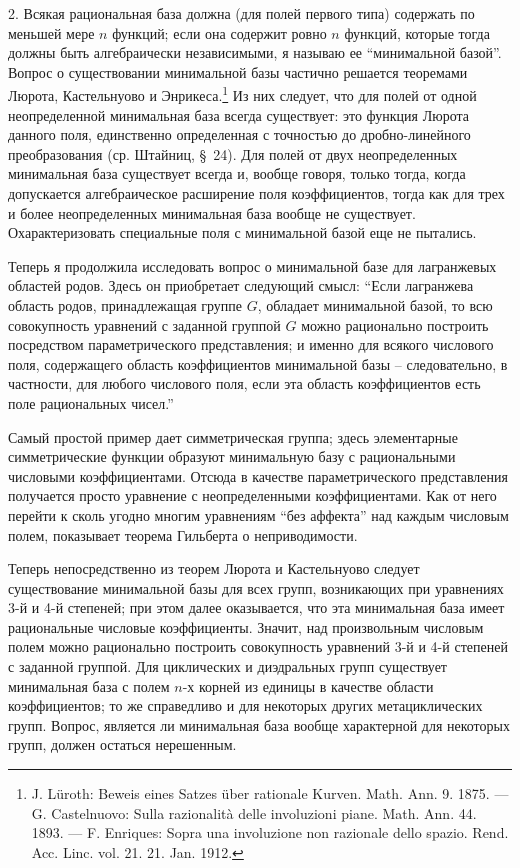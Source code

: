 \documentclass[11pt]{article}
\begin{document}
2. Всякая рациональная база должна (для полей первого типа) содержать по меньшей мере $n$ функций; если она содержит ровно $n$ функций, которые тогда должны быть алгебраически независимыми, я называю ее ``минимальной базой''. Вопрос о существовании минимальной базы частично решается теоремами Люрота, Кастельнуово и Энрикеса.\footnote{J. Lüroth: Beweis eines Satzes über rationale Kurven. Math. Ann. 9. 1875. --- G. Castelnuovo: Sulla razionalità delle involuzioni piane. Math. Ann. 44. 1893. --- F. Enriques: Sopra una involuzione non razionale dello spazio. Rend. Acc. Linc. vol. 21. 21. Jan. 1912.} Из них следует, что для полей от одной неопределенной минимальная база всегда существует: это функция Люрота данного поля, единственно определенная с точностью до дробно-линейного преобразования (ср. Штайниц, \S\ 24). Для полей от двух неопределенных минимальная база существует всегда и, вообще говоря, только тогда, когда допускается алгебраическое расширение поля коэффициентов, тогда как для трех и более неопределенных минимальная база вообще не существует. Охарактеризовать специальные поля с минимальной базой еще не пытались.

Теперь я продолжила исследовать вопрос о минимальной базе для лагранжевых областей родов. Здесь он приобретает следующий смысл: ``Если лагранжева область родов, принадлежащая группе $G$, обладает минимальной базой, то всю совокупность уравнений с заданной группой $G$ можно рационально построить посредством параметрического представления; и именно для всякого числового поля, содержащего область коэффициентов минимальной базы -- следовательно, в частности, для любого числового поля, если эта область коэффициентов есть поле рациональных чисел.''

Самый простой пример дает симметрическая группа; здесь элементарные симметрические функции образуют минимальную базу с рациональными числовыми коэффициентами. Отсюда в качестве параметрического представления получается просто уравнение с неопределенными коэффициентами. Как от него перейти к сколь угодно многим уравнениям ``без аффекта'' над каждым числовым полем, показывает теорема Гильберта о неприводимости.

Теперь непосредственно из теорем Люрота и Кастельнуово следует существование минимальной базы для всех групп, возникающих при уравнениях 3-й и 4-й степеней; при этом далее оказывается, что эта минимальная база имеет рациональные числовые коэффициенты. Значит, над произвольным числовым полем можно рационально построить совокупность уравнений 3-й и 4-й степеней с заданной группой. Для циклических и диэдральных групп существует минимальная база с полем $n$-х корней из единицы в качестве области коэффициентов; то же справедливо и для некоторых других метациклических групп. Вопрос, является ли минимальная база вообще характерной для некоторых групп, должен остаться нерешенным.
\end{document}
